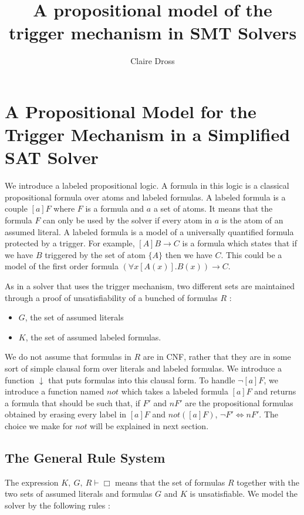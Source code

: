 \documentclass[a4paper,10pt]{article}
\title{A propositional model of the trigger mechanism in SMT Solvers}
\author{Claire Dross}
\newcommand{\gen}{\vdash}
\newcommand{\nnot}{\mathit{not}}
\begin{document}
\maketitle

\begin{abstract}

\end{abstract}

\section{A Propositional Model for the Trigger Mechanism in a Simplified SAT Solver}
We introduce a labeled propositional logic. A formula in this logic is a classical propositional
formula over atoms and labeled formulas. A labeled formula is a couple $[a]F$ where $F$ is a
formula and $a$ a set of atoms. It means that the formula $F$ can only be used by the solver if
every atom in $a$ is the atom of an assumed literal. A labeled formula is a model of a universally
quantified formula protected by a trigger. For example, $[A]B\rightarrow C$ is a formula which states 
that if we have $B$ triggered by the set of atom $\{A\}$ then we have $C$. This could be a model of
the first order formula $(\forall x [A(x)]. B(x))\rightarrow C$.

As in a solver that uses the trigger mechanism, two different sets are maintained through a
proof of unsatisfiability of a bunched of formulas $R$ :
\begin{itemize}
 \item $G$, the set of assumed literals
 \item $K$, the set of assumed labeled formulas.
\end{itemize}
We do not assume that formulas in $R$ are in CNF, rather that they are in some sort of simple clausal
form over literals and labeled formulas. We introduce a function $\downarrow$ that puts formulas
into this clausal form. To handle $\neg[a]F$, we introduce a function named $\nnot$ which takes
a labeled formula $[a]F$ and returns a formula that should be such that, if $F'$ and $nF'$ are the 	propositional formulas obtained by erasing every label in $[a]F$ and $\nnot([a]F)$,
$\neg F'\Leftrightarrow nF'$. The choice we make for $\nnot$ will be explained in next section.

\subsection{The General Rule System}
The expression $K,\ G,\ R\gen\Box$ means that the set of formulas $R$ together with the two sets
of assumed literals and formulas $G$ and $K$ is unsatisfiable. We model the solver by the following
rules :
\end{document}
